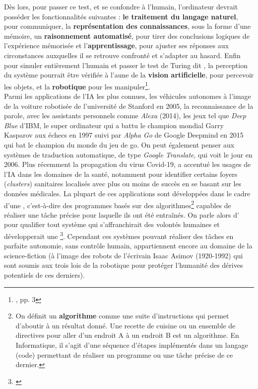 Dès lors, pour passer ce test, et se confondre à l'humain, l'ordinateur devrait posséder les fonctionnalités suivantes : \textbf{le traitement du langage naturel}, pour communiquer, la \textbf{représentation des connaissances}, sous la forme d'une mémoire, un \textbf{raisonnement automatisé}, pour tirer des conclusions logiques de l'expérience mémorisée et l'\textbf{apprentissage}, pour ajuster ses réponses aux circonstances auxquelles il se retrouve confronté et s'adapter au hasard. Enfin pour simuler entièrement l'humain et passer le test de Turing dit , la perception du système pourrait être vérifiée à l'aune de la \textbf{vision artificielle}, pour percevoir les objets, et la \textbf{robotique} pour les manipuler\footnote{\cite{russell_intelligence_2010}, pp. 3}.\\

Parmi les applications de l'IA les plus connues, les véhicules autonomes à l'image de la voiture robotisée de l'université de Stanford en 2005, la reconnaissance de la parole, avec les assistants personnels comme \textit{Alexa} (2014), les jeux tel que \textit{Deep Blue} d'IBM, le super ordinateur qui a battu le champion mondial Garry Kasparov aux échecs en 1997 suivi par \textit{Alpha Go} de Google Deepmind en 2015  qui bat le champion du monde du jeu de go. On peut également penser aux systèmes de traduction automatique, de type \textit{Google Translate}, qui voit le jour en 2006. Plus récemment la propagation du virus Covid-19, a accentué les usages de l'IA dans les domaines de la santé, notamment pour identifier certains foyers (\textit{clusters}) sanitaires localisés avec plus ou moins de succès en se basant sur les données médicales.
\newpage
La plupart de ces applications sont développées dans le cadre d'une , c'est-à-dire des programmes basés sur des algorithmes\footnote{On définit un \textbf{algorithme} comme une suite d'instructions qui permet d'aboutir à un résultat donné. Une recette de cuisine ou un ensemble de directives pour aller d'un endroit A à un endroit B est un algorithme. En Informatique, il s'agit d'une séquence d'étapes implémentés dans un langage (code) permettant de réaliser un programme ou une tâche précise de ce dernier.} capables de réaliser une tâche précise pour laquelle ils ont été entraînés. On parle alors d' pour qualifier tout système qui s'affranchirait des volontés humaines et développerait une \footnote{\cite{ganascia_mythe_2017}}. Cependant ces systèmes pouvant réaliser des tâches en parfaite autonomie, sans contrôle humain, appartiennent encore au domaine de la science-fiction (à l'image des robots de l'écrivain Isaac Asimov (1920-1992) qui sont soumis aux trois lois de la robotique pour protéger l'humanité des dérives potentiels de ces derniers).\\ 

